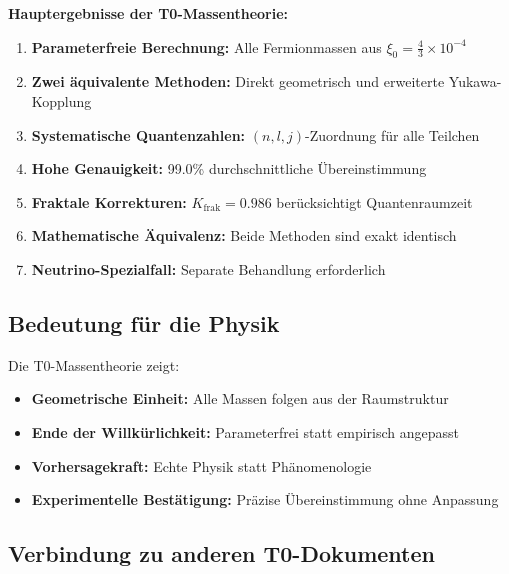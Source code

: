 \documentclass[12pt,a4paper]{article}
\begin{document}
	\begin{keyresult}
		\textbf{Hauptergebnisse der T0-Massentheorie:}
		
		\begin{enumerate}
			\item \textbf{Parameterfreie Berechnung:} Alle Fermionmassen aus $\xi_0 = \frac{4}{3} \times 10^{-4}$
			
			\item \textbf{Zwei äquivalente Methoden:} Direkt geometrisch und erweiterte Yukawa-Kopplung
			
			\item \textbf{Systematische Quantenzahlen:} $(n,l,j)$-Zuordnung für alle Teilchen
			
			\item \textbf{Hohe Genauigkeit:} 99.0\% durchschnittliche Übereinstimmung
			
			\item \textbf{Fraktale Korrekturen:} $K_{\text{frak}} = 0.986$ berücksichtigt Quantenraumzeit
			
			\item \textbf{Mathematische Äquivalenz:} Beide Methoden sind exakt identisch
			
			\item \textbf{Neutrino-Spezialfall:} Separate Behandlung erforderlich
		\end{enumerate}
	\end{keyresult}
	
	\subsection{Bedeutung für die Physik}
	
	Die T0-Massentheorie zeigt:
	\begin{itemize}
		\item \textbf{Geometrische Einheit:} Alle Massen folgen aus der Raumstruktur
		\item \textbf{Ende der Willkürlichkeit:} Parameterfrei statt empirisch angepasst
		\item \textbf{Vorhersagekraft:} Echte Physik statt Phänomenologie
		\item \textbf{Experimentelle Bestätigung:} Präzise Übereinstimmung ohne Anpassung
	\end{itemize}
	
	\subsection{Verbindung zu anderen T0-Dokumenten}
	
\end{document}
